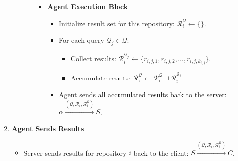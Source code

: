 \documentclass[11pt]{article}
\begin{document}
\begin{enumerate}
\begin{itemize}
\begin{itemize}
\begin{itemize}
\item \textbf{\textbf{Agent Execution Block}}
\begin{itemize}
\item Initialize result set for this repository: \(\mathcal{R}_i^{\mathcal{Q}} \gets \{\}\).
\item For each query \(\mathcal{Q}_j \in \mathcal{Q}\):
\begin{itemize}
\item Collect results:  
\(\mathcal{R}_i^{\mathcal{Q}_j} \gets \{ r_{i,j,1}, r_{i,j,2}, \dots, r_{i,j,k_{i,j}} \}\).
\item Accumulate results:  
\(\mathcal{R}_i^{\mathcal{Q}} \gets \mathcal{R}_i^{\mathcal{Q}} \cup \mathcal{R}_i^{\mathcal{Q}_j}\).
\end{itemize}
\item Agent sends all accumulated results back to the server:  
\(\alpha \xrightarrow{(\mathcal{Q}, \mathcal{R}_i, \mathcal{R}_i^{\mathcal{Q}})} S\).
\end{itemize}
\end{itemize}
\end{itemize}
\end{itemize}

\item \textbf{\textbf{Agent Sends Results}}
\begin{itemize}
\item Server sends results for repository \(i\) back to the client:  
\(S \xrightarrow{(\mathcal{Q}, \mathcal{R}_i, \mathcal{R}_i^{\mathcal{Q}})} C\).
\end{itemize}
\end{enumerate}
\end{document}
